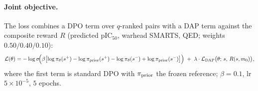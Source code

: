\paragraph{Joint objective.} The loss combines a DPO term over $q$-ranked pairs with a DAP term against the composite reward $R$ (predicted pIC$_{50}$, warhead SMARTS, QED; weights $0.50/0.40/0.10$):
{\footnotesize
\[
\mathcal{L}(\theta) = -\log \sigma\!\Bigl(\beta\bigl[\log \pi_\theta(s^+) - \log \pi_{\text{prior}}(s^+) - \log \pi_\theta(s^-) + \log \pi_{\text{prior}}(s^-)\bigr]\Bigr) \;+\; \lambda \cdot \mathcal{L}_{\text{DAP}}\bigl(\theta;\, s,\, R(s, m_0)\bigr),
\]}
where the first term is standard DPO \cite{rafailov2023dpo} with $\pi_{\text{prior}}$ the frozen \Cvcond{} reference; $\beta=0.1$, lr $5\times 10^{-5}$, $5$ epochs.

